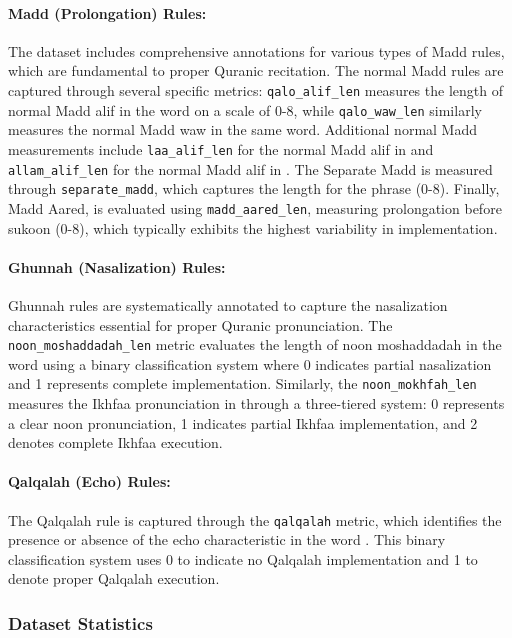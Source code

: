 \paragraph{Madd (Prolongation) Rules:}
The dataset includes comprehensive annotations for various types of Madd rules, which are fundamental to proper Quranic recitation. The normal Madd rules are captured through several specific metrics: \texttt{qalo\_alif\_len} measures the length of normal Madd alif in the word  on a scale of 0-8, while \texttt{qalo\_waw\_len} similarly measures the normal Madd waw in the same word. Additional normal Madd measurements include \texttt{laa\_alif\_len} for the normal Madd alif in  and \texttt{allam\_alif\_len} for the normal Madd alif in . The Separate Madd is measured through \texttt{separate\_madd}, which captures the length for the phrase  (0-8). Finally, Madd Aared, is evaluated using \texttt{madd\_aared\_len}, measuring prolongation before sukoon (0-8), which typically exhibits the highest variability in implementation.

\paragraph{Ghunnah (Nasalization) Rules:}
Ghunnah rules are systematically annotated to capture the nasalization characteristics essential for proper Quranic pronunciation. The \texttt{noon\_moshaddadah\_len} metric evaluates the length of noon moshaddadah in the word  using a binary classification system where 0 indicates partial nasalization and 1 represents complete implementation. Similarly, the \texttt{noon\_mokhfah\_len} measures the Ikhfaa pronunciation in  through a three-tiered system: 0 represents a clear noon pronunciation, 1 indicates partial Ikhfaa implementation, and 2 denotes complete Ikhfaa execution.

\paragraph{Qalqalah (Echo) Rules:}
The Qalqalah rule is captured through the \texttt{qalqalah} metric, which identifies the presence or absence of the echo characteristic in the word . This binary classification system uses 0 to indicate no Qalqalah implementation and 1 to denote proper Qalqalah execution.


\subsubsection{Dataset Statistics}

